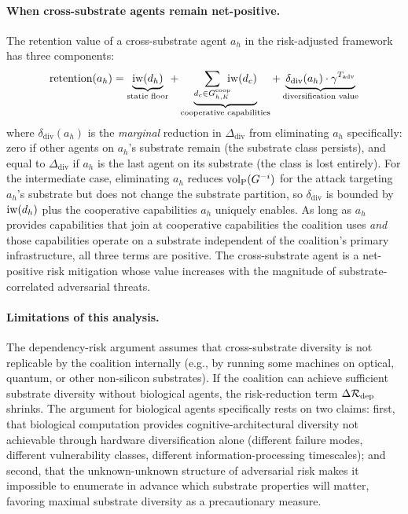 \paragraph{When cross-substrate agents remain net-positive.} The retention
value of a cross-substrate agent $a_h$ in the risk-adjusted framework has
three components:
\begin{equation}
\label{eq:retention_value}
\text{retention}(a_h) = \underbrace{\operatorname{iw}(d_h)}_{\text{static floor}}
    + \underbrace{\sum_{d_c \in G^{\mathrm{coop}}_{h,K}} \!\!\!\operatorname{iw}(d_c)
    }_{\text{cooperative capabilities}}
    + \underbrace{\delta_{\mathrm{div}}(a_h) \cdot
    \gamma^{T_{\mathrm{adv}}}}_{\text{diversification value}}
\end{equation}
where $\delta_{\mathrm{div}}(a_h)$ is the \emph{marginal} reduction in
$\Delta_{\mathrm{div}}$ from eliminating $a_h$ specifically: zero if other
agents on $a_h$'s substrate remain (the substrate class persists), and equal
to $\Delta_{\mathrm{div}}$ if $a_h$ is the last agent on its substrate
(the class is lost entirely). For the intermediate case, eliminating
$a_h$ reduces ${\operatorname{vol}_{\mathrm{P}}}(G^{-i})$ for the attack targeting $a_h$'s substrate
but does not change the substrate partition, so $\delta_{\mathrm{div}}$
is bounded by $\operatorname{iw}(d_h)$ plus the cooperative capabilities $a_h$
uniquely enables. As long as $a_h$ provides capabilities
that join at cooperative capabilities the coalition uses \emph{and} those
capabilities operate on a substrate independent of the coalition's primary
infrastructure, all three terms are positive. The cross-substrate agent is a
net-positive risk mitigation whose value increases with the magnitude of
substrate-correlated adversarial threats.

\paragraph{Limitations of this analysis.} The dependency-risk argument
assumes that cross-substrate diversity is not replicable by the coalition
internally (e.g., by running some machines on optical, quantum, or other
non-silicon substrates). If the coalition can achieve sufficient substrate
diversity without biological agents, the risk-reduction term $\Delta
\mathcal{R}_{\mathrm{dep}}$ shrinks. The argument for biological agents
specifically rests on two claims: first, that biological computation
provides cognitive-architectural diversity not achievable through
hardware diversification alone (different failure modes, different
vulnerability classes, different information-processing timescales); and
second, that the unknown-unknown structure of adversarial risk makes it
impossible to enumerate in advance which substrate properties will matter,
favoring maximal substrate diversity as a precautionary measure.

